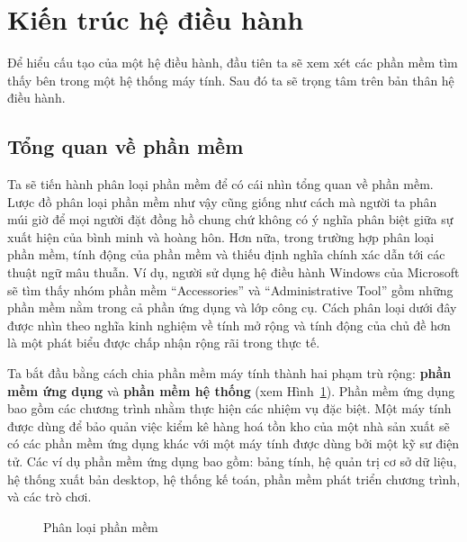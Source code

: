 \section{Kiến trúc hệ điều hành}

Để hiểu cấu tạo của một hệ điều hành, đầu tiên ta sẽ xem xét các phần mềm tìm thấy
bên trong một hệ thống máy tính. Sau đó ta sẽ trọng tâm trên bản thân hệ điều hành.

\subsection*{Tổng quan về phần mềm}

Ta sẽ tiến hành phân loại phần mềm để có cái nhìn tổng quan về phần mềm.  Lược đồ
phân loại phần mềm như vậy cũng giống như cách mà người ta phân múi giờ để mọi người đặt
đồng hồ chung chứ không có ý nghĩa phân biệt giữa sự xuất hiện của bình minh và hoàng
hôn. Hơn nữa, trong trường hợp phân loại phần mềm, tính động của phần mềm và thiếu định
nghĩa chính xác dẫn tới các thuật ngữ mâu thuẫn. Ví dụ, người sử dụng hệ điều hành Windows
của Microsoft sẽ tìm thấy nhóm phần mềm ``Accessories'' và ``Administrative Tool'' gồm
những phần mềm nằm trong cả phần ứng dụng và lớp công cụ. Cách phân loại dưới đây được
nhìn theo nghĩa kinh nghiệm về tính mở rộng và tính động của chủ đề hơn là một phát biểu
được chấp nhận rộng rãi trong thực tế.

Ta bắt đầu bằng cách chia phần mềm máy tính thành hai phạm trù rộng: \textbf{phần mềm ứng
  dụng} và \textbf{phần mềm hệ thống} (xem Hình~\ref{fig:fig3.3}). Phần mềm ứng dụng bao
gồm các chương trình nhằm thực hiện các nhiệm vụ đặc biệt. Một máy tính được dùng để bảo
quản việc kiểm kê hàng hoá tồn kho của một nhà sản xuất sẽ có các phần mềm ứng dụng khác
với một máy tính được dùng bởi một kỹ sư điện tử. Các ví dụ phần mềm ứng dụng bao gồm:
bảng tính, hệ quản trị cơ sở dữ liệu, hệ thống xuất bản desktop, hệ thống kế toán, phần
mềm phát triển chương trình, và các trò chơi.

\begin{figure}[tb]
  \centering {}
  \caption{Phân loại phần mềm}
  \label{fig:fig3.3}
\end{figure}

